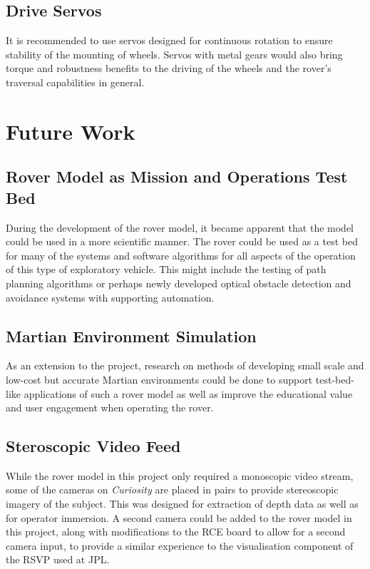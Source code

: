     \subsection{Drive Servos}
      It is recommended to use servos designed for continuous rotation to ensure stability of the mounting of wheels. Servos with metal gears would also bring torque and robustness benefits to the driving of the wheels and the rover's traversal capabilities in general.
      
  \section{Future Work}
    \subsection{Rover Model as Mission and Operations Test Bed}
      During the development of the rover model, it became apparent that the model could be used in a more scientific manner. The rover could be used as a test bed for many of the systems and software algorithms for all aspects of the operation of this type of exploratory vehicle. This might include the testing of path planning algorithms or perhaps newly developed optical obstacle detection and avoidance systems with supporting automation.
      
    \subsection{Martian Environment Simulation}
    \label{subsec:fut-martianEnvironmentSimulation}
      As an extension to the project, research on methods of developing small scale and low-cost but accurate Martian environments could be done to support test-bed-like applications of such a rover model as well as improve the educational value and user engagement when operating the rover.
    
    \subsection{Steroscopic Video Feed}
      While the rover model in this project only required a monoscopic video stream, some of the cameras on \textit{Curiosity} are placed in pairs to provide stereoscopic imagery of the subject. This was designed for extraction of depth data as well as for operator immersion. A second camera could be added to the rover model in this project, along with modifications to the RCE board to allow for a second camera input, to provide a similar experience to the visualisation component of the RSVP used at JPL. 
    
